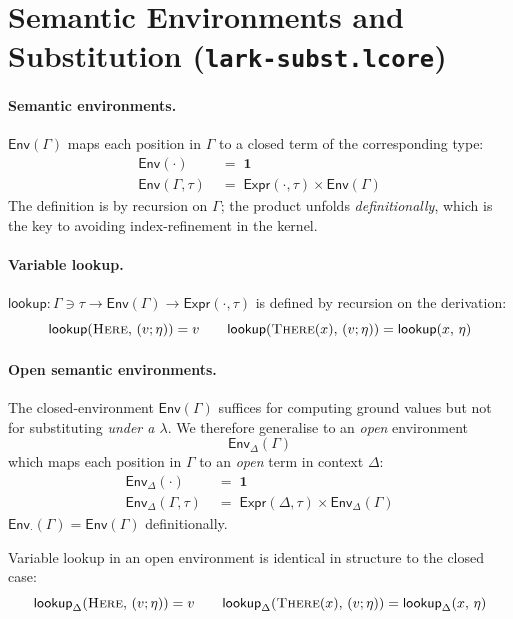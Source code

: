 \documentclass[10pt,a4paper]{article}
\newcommand{\inctx}[2]{#1 \ni #2}               %
\newcommand{\SemEnv}[1]{\mathsf{Env}(#1)}
\newcommand{\SemEnvD}[2]{\mathsf{Env}_{#1}(#2)}
\newcommand{\lfile}[1]{\texttt{#1}}
\theoremstyle{plain}
\theoremstyle{definition}
\theoremstyle{remark}
\begin{document}
\section{Semantic Environments and Substitution (\lfile{lark-subst.lcore})}
\label{sec:subst}

\paragraph{Semantic environments.}
$\SemEnv{\Gamma}$ maps each position in $\Gamma$ to a closed term of the
corresponding type:
\begin{align*}
\SemEnv{\cdot} &\;=\; \mathbf{1}\\
\SemEnv{\Gamma,\tau} &\;=\; \mathsf{Expr}(\cdot,\tau)\times\SemEnv{\Gamma}
\end{align*}
The definition is by recursion on $\Gamma$; the product unfolds \emph{definitionally},
which is the key to avoiding index-refinement in the kernel.

\paragraph{Variable lookup.}
$\mathsf{lookup} : \inctx{\Gamma}{\tau} \to \SemEnv{\Gamma} \to \mathsf{Expr}(\cdot,\tau)$
is defined by recursion on the derivation:
\[
  \mathsf{lookup}(\textsc{Here},\,(v;\eta)) = v
  \qquad
  \mathsf{lookup}(\textsc{There}(x),\,(v;\eta)) = \mathsf{lookup}(x,\,\eta)
\]

\paragraph{Open semantic environments.}
The closed-environment $\SemEnv{\Gamma}$ suffices for computing ground values
but not for substituting \emph{under a $\lambda$}.
We therefore generalise to an \emph{open} environment
\[
  \SemEnvD{\Delta}{\Gamma}
\]
which maps each position in $\Gamma$ to an \emph{open} term in context $\Delta$:
\begin{align*}
\SemEnvD{\Delta}{\cdot}           &\;=\; \mathbf{1}\\
\SemEnvD{\Delta}{\Gamma,\tau}     &\;=\; \mathsf{Expr}(\Delta,\tau)\times\SemEnvD{\Delta}{\Gamma}
\end{align*}
$\SemEnvD{\cdot}{\Gamma} = \SemEnv{\Gamma}$ definitionally.

Variable lookup in an open environment is identical in structure to the
closed case:
\[
  \mathsf{lookup}_\Delta(\textsc{Here},\,(v;\eta)) = v
  \qquad
  \mathsf{lookup}_\Delta(\textsc{There}(x),\,(v;\eta)) = \mathsf{lookup}_\Delta(x,\,\eta)
\]
\end{document}
